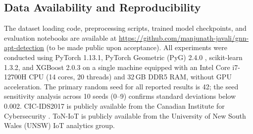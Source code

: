 \documentclass[conference]{IEEEtran}
\begin{document}
\subsection{Data Availability and Reproducibility}

The dataset loading code, preprocessing scripts, trained model
checkpoints, and evaluation notebooks are available at
\url{https://github.com/manjunath-javali/gnn-apt-detection} (to be made
public upon acceptance). All experiments were conducted using PyTorch
1.13.1, PyTorch Geometric (PyG) 2.4.0 \cite{fey2019}, scikit-learn 1.3.2,
and XGBoost 2.0.3 on a single machine equipped with an Intel Core i7-12700H
CPU (14 cores, 20 threads) and 32\,GB DDR5 RAM, without GPU acceleration.
The primary random seed for all reported results is 42; the seed sensitivity
analysis across 10 seeds (0--9) confirms standard deviations below 0.002.
CIC-IDS2017 is publicly available from the Canadian Institute for
Cybersecurity \cite{sharafaldin2018}. ToN-IoT is publicly available from
the University of New South Wales (UNSW) IoT analytics group.



\end{document}
